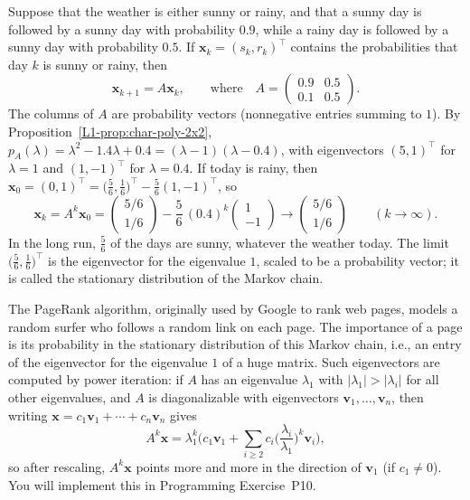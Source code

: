 \begin{example}\label{L1-ex:markov}
    Suppose that the weather is either sunny or rainy, and that a sunny day is followed by a sunny day with probability $0.9$, while a rainy day is followed by a sunny day with probability $0.5$. If $\mathbf{x}_k = (s_k, r_k)^\top$ contains the probabilities that day $k$ is sunny or rainy, then
    \[\mathbf{x}_{k+1} = A \mathbf{x}_k, \qquad \text{where} \quad A = \begin{pmatrix} 0.9 & 0.5 \\ 0.1 & 0.5 \end{pmatrix}.\]
    The columns of $A$ are probability vectors (nonnegative entries summing to $1$). By Proposition~\ref{L1-prop:char-poly-2x2}, $p_A(\lambda) = \lambda^2 - 1.4\lambda + 0.4 = (\lambda - 1)(\lambda - 0.4)$, with eigenvectors $(5, 1)^\top$ for $\lambda = 1$ and $(1, -1)^\top$ for $\lambda = 0.4$. If today is rainy, then $\mathbf{x}_0 = (0, 1)^\top = \big(\frac{5}{6}, \frac{1}{6}\big)^\top - \frac{5}{6}(1, -1)^\top$, so
    \[\mathbf{x}_k = A^k \mathbf{x}_0 = \begin{pmatrix} 5/6 \\ 1/6 \end{pmatrix} - \frac{5}{6}\, (0.4)^k \begin{pmatrix} 1 \\ -1 \end{pmatrix} \longrightarrow \begin{pmatrix} 5/6 \\ 1/6 \end{pmatrix} \qquad (k \to \infty).\]
    In the long run, $\frac{5}{6}$ of the days are sunny, whatever the weather today. The limit $\big(\frac{5}{6}, \frac{1}{6}\big)^\top$ is the eigenvector for the eigenvalue $1$, scaled to be a probability vector; it is called the stationary distribution of the Markov chain.
\end{example}

\begin{remark}
    The PageRank algorithm, originally used by Google to rank web pages, models a random surfer who follows a random link on each page. The importance of a page is its probability in the stationary distribution of this Markov chain, i.e., an entry of the eigenvector for the eigenvalue $1$ of a huge matrix. Such eigenvectors are computed by power iteration: if $A$ has an eigenvalue $\lambda_1$ with $|\lambda_1| > |\lambda_i|$ for all other eigenvalues, and $A$ is diagonalizable with eigenvectors $\mathbf{v}_1, \ldots, \mathbf{v}_n$, then writing $\mathbf{x} = c_1 \mathbf{v}_1 + \cdots + c_n \mathbf{v}_n$ gives
    \[A^k \mathbf{x} = \lambda_1^k \Big(c_1 \mathbf{v}_1 + \sum_{i \geq 2} c_i \Big(\frac{\lambda_i}{\lambda_1}\Big)^k \mathbf{v}_i\Big),\]
    so after rescaling, $A^k \mathbf{x}$ points more and more in the direction of $\mathbf{v}_1$ (if $c_1 \neq 0$). You will implement this in Programming Exercise~P10.
\end{remark}

